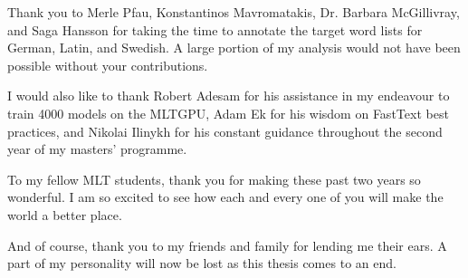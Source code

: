\documentclass[11pt, a4paper]{article}
\begin{document}
Thank you to Merle Pfau, Konstantinos Mavromatakis, Dr. Barbara McGillivray, and Saga Hansson for taking the time to annotate the target word lists for German, Latin, and Swedish. A large portion of my analysis would not have been possible without your contributions. 

I would also like to thank Robert Adesam for his assistance in my endeavour to train 4000 models on the MLTGPU, Adam Ek for his wisdom on FastText best practices, and Nikolai Ilinykh for his constant guidance throughout the second year of my masters’ programme. 

To my fellow MLT students, thank you for making these past two years so wonderful. I am so excited to see how each and every one of you will make the world a better place. 

And of course, thank you to my friends and family for lending me their ears. A part of my personality will now be lost as this thesis comes to an end.


\thispagestyle{empty}

\newpage

\begingroup
\hypersetup{linkcolor=black} %
\begin{spacing}{0.0}
\tableofcontents
\end{spacing}
\endgroup

\thispagestyle{empty}

\newpage
\setcounter{page}{1}






\newpage



\newpage



\newpage


\end{document}

